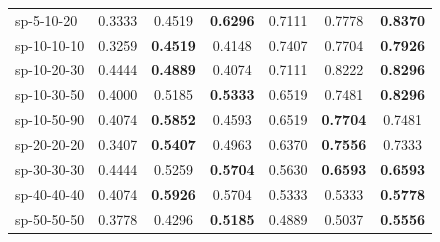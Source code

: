 \begin{table}[!ht]
{\begin{tabular}{lcccccc}
    sp-5-10-20  & 0.3333 & 0.4519 & \textbf{0.6296} & 0.7111 & 0.7778 &  \textbf{0.8370} \\
    sp-10-10-10 & 0.3259 & \textbf{0.4519} & 0.4148 & 0.7407 & 0.7704 & \textbf{0.7926} \\
    sp-10-20-30                  & 0.4444                           & \textbf{0.4889} & 0.4074                            & 0.7111   & 0.8222                           & \textbf{0.8296} \\
    sp-10-30-50                 & 0.4000                           & 0.5185                           & \textbf{0.5333}  & 0.6519   & 0.7481                           & \textbf{0.8296} \\
    sp-10-50-90  & 0.4074 & \textbf{0.5852} & 0.4593 & 0.6519 & \textbf{0.7704} & 0.7481 \\
    sp-20-20-20 & 0.3407 & \textbf{0.5407} & 0.4963 & 0.6370 & \textbf{0.7556} & 0.7333 \\
    sp-30-30-30 & 0.4444 & 0.5259 & \textbf{0.5704} & 0.5630 & \textbf{0.6593} & \textbf{0.6593} \\
    sp-40-40-40 & 0.4074 & \textbf{0.5926} & 0.5704 & 0.5333 & 0.5333 & \textbf{0.5778} \\
    sp-50-50-50 & 0.3778 & 0.4296 & \textbf{0.5185} & 0.4889 & 0.5037 & \textbf{0.5556} \\
    \hline
    \end{tabular}%
        }
    \end{table}
    
